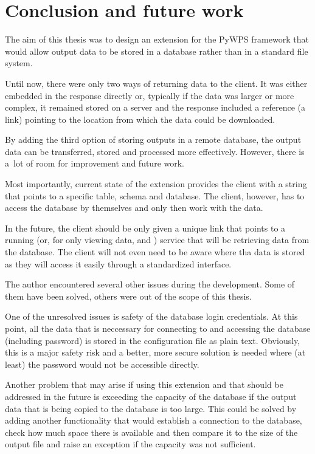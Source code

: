 \chapter{Conclusion and future work}
\label{5-conclusion}


The aim of this thesis was to design an extension for the PyWPS
framework that would allow output data to be stored in a database
rather than in a standard file system.

Until now, there were only two ways of returning data to the
client. It was either embedded in the response directly or, typically
if the data was larger or more complex, it remained stored on a server
and the response included a reference (a~ link) pointing to
the location from which the data could be downloaded.

By adding the third option of storing outputs in a remote database,
the output data can be transferred, stored and processed more
effectively. However, there is a~lot of room for improvement and
future work.

Most importantly, current state of the extension provides the client
with a string that points to a specific table, schema and
database. The client, however, has to access the database by
themselves and only then work with the data.

In the future, the client should be only given a unique  link
that points to a running  (or, for only viewing data,  
and ) service that will be retrieving data from the database. 
The client will not even need to be aware where tha data is stored 
as they will access it easily through a standardized interface.

The author encountered several other issues during the
development. Some of them have been solved, others were out of the
scope of this thesis.

One of the unresolved issues is safety of the database login
credentials. At this point, all the data that is neccessary for
connecting to and accessing the database (including password) is
stored in the configuration file as plain text. Obviously, this is a
major safety risk and a better, more secure solution is needed where
(at least) the password would not be accessible directly.

Another problem that may arise if using this extension and that should
be addressed in the future is exceeding the capacity of the database
if the output data that is being copied to the database is too
large. This could be solved by adding another functionality that would
establish a connection to the database, check how much space there is
available and then compare it to the size of the output file and raise
an exception if the capacity was not sufficient.

